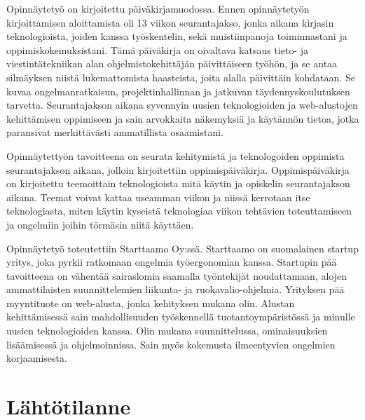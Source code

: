\documentclass[11pt,a4paper,titlepage,oneside]{article}
\begin{document}
Opinnäytetyö on kirjoitettu päiväkirjamuodossa. 
Ennen opinnäytetyön kirjoittamisen aloittamista oli 13 viikon seurantajakso, jonka aikana kirjasin teknologioista,
joiden kanssa työskentelin, sekä muistiinpanoja toiminnastani ja oppimiskokemuksistani.
Tämä päiväkirja on oivaltava katsaus tieto- ja viestintätekniikan alan ohjelmistokehittäjän päivittäiseen työhön,
ja se antaa silmäyksen niistä lukemattomista haasteista, joita alalla päivittäin kohdataan.
Se kuvaa ongelmanratkaisun, projektinhallinnan ja jatkuvan täydennyskoulutuksen tarvetta.
Seurantajakson aikana syvennyin uusien teknologioiden ja web-alustojen kehittämisen oppimiseen ja sain arvokkaita näkemyksiä ja käytännön tietoa,
jotka paransivat merkittävästi ammatillista osaamistani.
\medskip



Opinnäytettyön tavoitteena on seurata kehitymistä ja teknologoiden oppimista seurantajakson aikana,
jolloin kirjoitettiin oppimispäiväkirja.
Oppimispäiväkirja on kirjoitettu teemoittain teknologioista mitä käytin ja opiskelin seurantajakson aikana.
Teemat voivat kattaa useamman viikon ja niissä kerrotaan itse teknologiasta, miten käytin kyseistä teknologiaa viikon tehtävien toteuttamiseen ja
ongelmiin joihin törmäsin niitä käyttäen.
\medskip





Opinnäytetyö toteutettiin Starttaamo Oy:ssä. Starttaamo on suomalainen startup yritys, joka pyrkii ratkomaan ongelmia työergonomian kanssa.
Startupin pää tavoitteena on vähentää sairaslomia saamalla työntekijät noudattamaan, alojen ammattilaisten suunnittelemien liikunta- ja ruokavalio-ohjelmia. 
Yrityksen pää myyntituote on web-alusta, jonka kehityksen mukana olin.
%
Alustan kehittämisessä sain mahdollisuuden työskennellä tuotantoympäristössä ja minulle uusien teknologioiden kanssa.
Olin mukana suunnittelussa, ominaisuuksien lisäämisessä ja ohjelmoinnissa. 
Sain myös kokemusta ilmeentyvien ongelmien korjaamisesta.

\medskip










\newpage
\section{Lähtötilanne}         %
\end{document}
